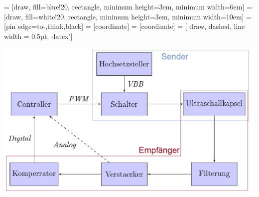  = [draw, fill=blue!20, rectangle, 
    minimum height=3em, minimum width=6em]
 = [draw, fill=white!20, rectangle, 
    minimum height=3em, minimum width=10em]
 = [pin edge={to-,think,black}]
 = [coordinate]
 = [coordinate]
 = [ draw, dashed, line width = 0.5pt, -latex']
\begin{center}
\begin{minipage}{0.75\textwidth}
\includegraphics[width=1\textwidth%
]{Abbildungen/Schema.png}
\label{fig:Blockschaltbild}
%

\end{minipage}
\end{center}
